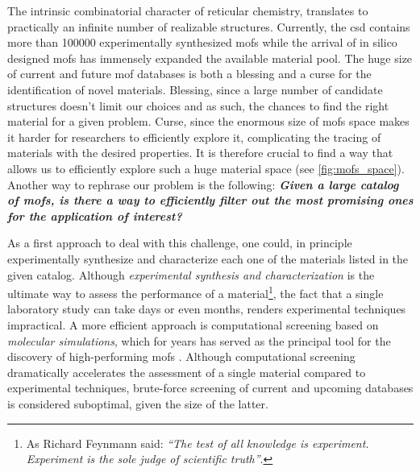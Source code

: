 The intrinsic combinatorial character of reticular chemistry, translates to
practically an infinite number of realizable structures. Currently, the
\gls{csd} contains more than \num{100000} experimentally synthesized \glspl{mof}
\parencite{siegel29} while the arrival of in silico designed \glspl{mof}
\parencite{siegel36, Rosen2021, Chung2019, chong51, DeVos2023, trillions,
Boyd_2019} has immensely expanded the available material pool. The huge size of
current and future \gls{mof} databases \parencite{trillions} is
both a blessing and a curse for the identification of novel materials. Blessing,
since a large number of candidate structures doesn't limit our choices and as
such, the chances to find the right material for a given problem. Curse, since
the enormous size of \glspl{mof} space makes it harder for researchers to
efficiently explore it, complicating the tracing of materials with the desired
properties. It is therefore crucial to find a way that allows us to efficiently
explore such a huge material space (see \Figure{} \ref{fig:mofs_space}). Another way
to rephrase our problem is the following: \emph{\bfseries Given a large catalog
of \glspl{mof}, is there a way to efficiently filter out the most promising ones
for the application of interest?}

As a first approach to deal with this challenge, one could, in principle
experimentally synthesize and characterize each one of the materials listed in
the given catalog. Although \emph{experimental synthesis and
characterization} is the ultimate way to assess the performance of a
material\footnote{As Richard Feynmann said: \emph{``The test of all knowledge is
experiment. Experiment is the sole judge of scientific truth''}.}, the fact that
a single laboratory study can take days or even months, renders experimental
techniques impractical.  A more efficient approach is computational
screening based on \emph{molecular
simulations}, which for years has served as the
principal tool for the discovery of high-performing \glspl{mof}
\parencite{Simon2015, chong56, Moghadam2018, chong58, chong59}. Although computational
screening dramatically accelerates the assessment of a single material compared
to experimental techniques, brute-force screening of current and upcoming
databases is considered suboptimal, given the size of the latter.

